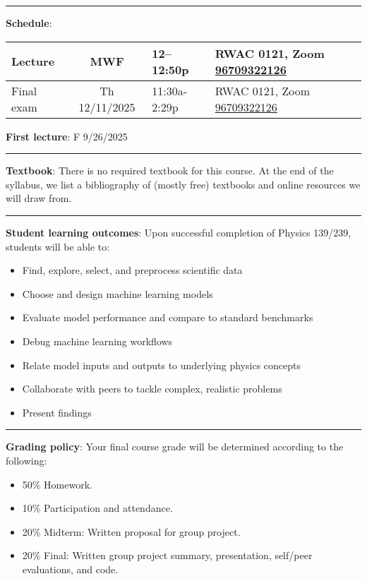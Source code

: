\documentclass[12pt]{article}
\begin{document}
\begin{center}
	\rule{\textwidth}{0.5pt}
\end{center}

\noindent\textbf{Schedule}:
\begin{center}
	\begin{tabular}{|l|c|l|m{60mm}|}
		\hline
		Lecture    & MWF           & 12--12:50p   & RWAC	0121, Zoom \href{https://ucsd.zoom.us/j/96709322126}{96709322126} \\\hline
		Final exam & Th 12/11/2025 & 11:30a-2:29p & RWAC 0121, Zoom \href{https://ucsd.zoom.us/j/96709322126}{96709322126} \\\hline
	\end{tabular}
\end{center}

\noindent\textbf{First lecture}: F 9/26/2025

\begin{center}
	\rule{\textwidth}{0.5pt}
\end{center}

\noindent\textbf{Textbook}: There is no required textbook for this course.
At the end of the syllabus, we list a bibliography of (mostly free) textbooks and online resources we will draw from.

\begin{center}
	\rule{\textwidth}{0.5pt}
\end{center}

\noindent\textbf{Student learning outcomes}: Upon successful completion of Physics 139/239, students will be able to:
\begin{itemize}
	\item Find, explore, select, and preprocess scientific data
	\item Choose and design machine learning models
	\item Evaluate model performance and compare to standard benchmarks
	\item Debug machine learning workflows
	\item Relate model inputs and outputs to underlying physics concepts
	\item Collaborate with peers to tackle complex, realistic problems
	\item Present findings
\end{itemize}

\begin{center}
	\rule{\textwidth}{0.5pt}
\end{center}

\noindent\textbf{Grading policy}: Your final course grade will be determined according to the following:
\begin{itemize}
	\item 50\% Homework.
	\item 10\% Participation and attendance.
	\item 20\% Midterm: Written proposal for group project.
	\item 20\% Final: Written group project summary, presentation, self/peer evaluations, and code.
\end{itemize}
\end{document}

